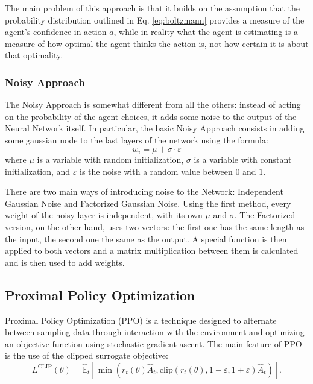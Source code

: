 \documentclass[a4paper, 12pt]{article}
\numberwithin{equation}{section}
\begin{document}
The main problem of this approach is that it builds on the assumption that the probability distribution outlined in Eq. \eqref{eq:boltzmann} provides a measure of the agent's confidence in action $a$, while in reality what the agent is estimating is a measure of how optimal the agent thinks the action is, not how certain it is about that optimality.



\subsubsection[Noisy Approach]{Noisy Approach \cite{deep-reinforcement, noisy}}

The Noisy Approach is somewhat different from all the others: instead of acting on the probability of the agent choices, it adds some noise to the output of the Neural Network itself. In particular, the basic Noisy Approach consists in adding some gaussian node to the last layers of the network using the formula:
\begin{equation}
	w_i = \mu+\sigma\cdot\varepsilon
\end{equation}
where $\mu$ is a variable with random initialization, $\sigma$ is a variable with constant initialization, and $\varepsilon$ is the noise with a random value between $0$ and $1$.

There are two main ways of introducing noise to the Network: Independent Gaussian Noise and Factorized Gaussian Noise. Using the first method, every weight of the noisy layer is independent, with its own $\mu$ and $\sigma$. The Factorized version, on the other hand, uses two vectors: the first one has the same length as the input, the second one the same as the output. A special function is then applied to both vectors and a matrix multiplication between them is calculated and is then used to add weights.




\subsection[Proximal Policy Optimization]{Proximal Policy Optimization \cite{ppo-algorithm, understanding-ppo}}
Proximal Policy Optimization (PPO) is a technique designed to alternate between sampling data through interaction with the environment and optimizing an objective function using stochastic gradient ascent. The main feature of PPO is the use of the clipped surrogate objective:
\begin{equation}
	L^\mathrm{CLIP}\left(\theta\right)=\hat{\mathbb{E}}_t\left[\min\left(r_t\left(\theta\right)\hat{A}_t,\mathrm{clip}\left(r_t\left(\theta\right),1-\varepsilon,1+\varepsilon\right)\hat{A}_t\right)\right].
\end{equation}
\end{document}

